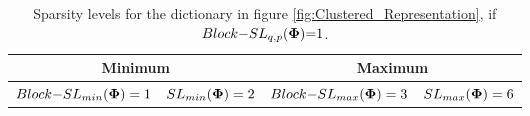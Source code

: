 \begin{table*}[t]
\centering
\begin{tabular}{cccc}
\toprule
\multicolumn{2}{c}{Minimum}  & \multicolumn{2}{c}{Maximum} \\ \midrule %
\multicolumn{1}{c}{$Block{-}SL_{min}(\boldsymbol{\Phi}) = 1$} & \multicolumn{1}{c}{$SL_{min}(\boldsymbol{\Phi}) = 2$} & \multicolumn{1}{c}{$Block{-}SL_{max}(\boldsymbol{\Phi}) = 3$} & \multicolumn{1}{c}{$SL_{max}(\boldsymbol{\Phi}) = 6$} \\ %
\bottomrule
\end{tabular}
\caption{Sparsity levels for the dictionary in figure \ref{fig:Clustered_Representation}, if $Block{-}SL_{q,p}(\boldsymbol{\Phi}) {=} 1$.}
\label{table:SLs}
\end{table*}